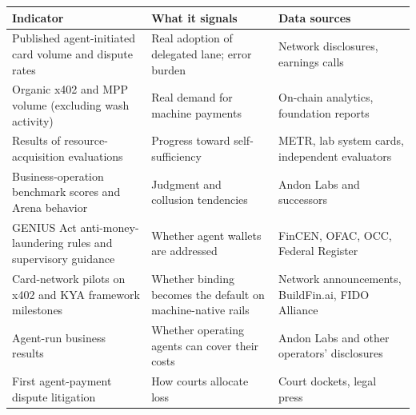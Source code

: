 \documentclass[11pt,letterpaper]{article}
\begin{document}
{\small
\setlength{\LTleft}{0pt}\setlength{\LTright}{0pt}
\begin{longtable}{L{5.6cm}L{5.6cm}L{4.8cm}}
\toprule
\textbf{Indicator} & \textbf{What it signals} & \textbf{Data sources} \\
\midrule
\endhead
Published agent-initiated card volume and dispute rates & Real adoption of delegated lane; error burden & Network disclosures, earnings calls \\
Organic x402 and MPP volume (excluding wash activity) & Real demand for machine payments & On-chain analytics, foundation reports \\
Results of resource-acquisition evaluations & Progress toward self-sufficiency & METR, lab system cards, independent evaluators \\
Business-operation benchmark scores and Arena behavior & Judgment and collusion tendencies & Andon Labs and successors \\
GENIUS Act anti-money-laundering rules and supervisory guidance & Whether agent wallets are addressed & FinCEN, OFAC, OCC, Federal Register \\
Card-network pilots on x402 and KYA framework milestones & Whether binding becomes the default on machine-native rails & Network announcements, BuildFin.ai, FIDO Alliance \\
Agent-run business results & Whether operating agents can cover their costs & Andon Labs and other operators' disclosures \\
First agent-payment dispute litigation & How courts allocate loss & Court dockets, legal press \\
\bottomrule
\end{longtable}
}
\end{document}
